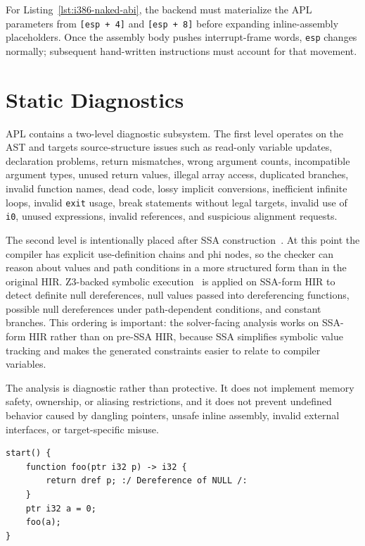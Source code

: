 \documentclass[10pt,twocolumn]{article}
\begin{document}
\par For Listing~\ref{lst:i386-naked-abi}, the backend must materialize the APL parameters from \texttt{[esp + 4]} and \texttt{[esp + 8]} before expanding inline-assembly placeholders. Once the assembly body pushes interrupt-frame words, \texttt{esp} changes normally; subsequent hand-written instructions must account for that movement.

\section{Static Diagnostics}
\par APL contains a two-level diagnostic subsystem. The first level operates on the AST and targets source-structure issues such as read-only variable updates, declaration problems, return mismatches, wrong argument counts, incompatible argument types, unused return values, illegal array access, duplicated branches, invalid function names, dead code, lossy implicit conversions, inefficient infinite loops, invalid \texttt{exit} usage, break statements without legal targets, invalid use of \texttt{i0}, unused expressions, invalid references, and suspicious alignment requests.
\par The second level is intentionally placed after SSA construction~\cite{cytron1991ssa}. At this point the compiler has explicit use-definition chains and phi nodes, so the checker can reason about values and path conditions in a more structured form than in the original HIR. Z3-backed symbolic execution~\cite{deMoura2008z3} is applied on SSA-form HIR to detect definite null dereferences, null values passed into dereferencing functions, possible null dereferences under path-dependent conditions, and constant branches. This ordering is important: the solver-facing analysis works on SSA-form HIR rather than on pre-SSA HIR, because SSA simplifies symbolic value tracking and makes the generated constraints easier to relate to compiler variables.
\par The analysis is diagnostic rather than protective. It does not implement memory safety, ownership, or aliasing restrictions, and it does not prevent undefined behavior caused by dangling pointers, unsafe inline assembly, invalid external interfaces, or target-specific misuse.

\begin{lstlisting}[language=APL,caption={Example that triggers SSA-level null-dereference diagnostics.}]
start() {
    function foo(ptr i32 p) -> i32 {
        return dref p; :/ Dereference of NULL /:
    }
    ptr i32 a = 0;
    foo(a);
}
\end{lstlisting}
\end{document}
